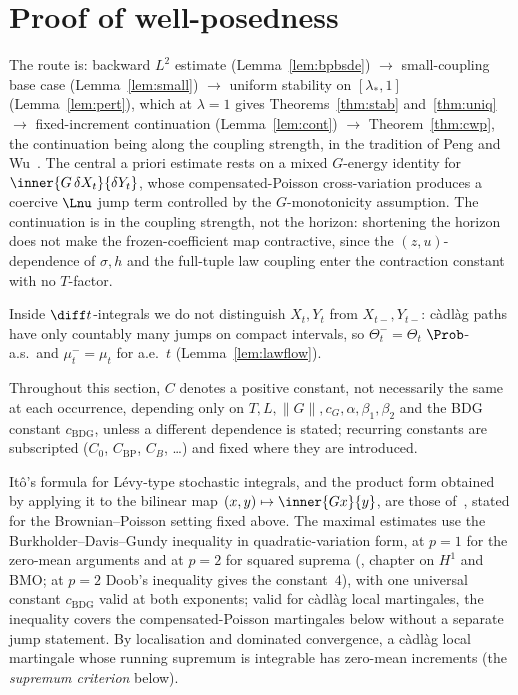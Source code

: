 \section{Proof of well-posedness}
\label{sec:wp-proof}

The route is: backward $L^2$ estimate
(Lemma~\ref{lem:bpbsde}) $\to$ small-coupling base case (Lemma~\ref{lem:small}) $\to$
uniform stability on $[\lambda_*,1]$ (Lemma~\ref{lem:pert}), which at $\lambda=1$ gives
Theorems~\ref{thm:stab} and~\ref{thm:uniq} $\to$ fixed-increment continuation
(Lemma~\ref{lem:cont}) $\to$ Theorem~\ref{thm:cwp}, the continuation being along the
coupling strength, in the tradition of Peng and Wu~\cite{PengWu}. The central a priori
estimate rests on a mixed $G$-energy identity for $\inner{G\,\delta X_t}{\delta Y_t}$,
whose compensated-Poisson cross-variation produces a coercive $\Lnu$ jump term controlled
by the $G$-monotonicity assumption. The continuation is in the coupling strength, not the
horizon: shortening the horizon does not make the frozen-coefficient map contractive,
since the $(z,u)$-dependence of $\sigma,h$ and the full-tuple law coupling enter the
contraction constant with no $T$-factor.

Inside $\diff t$-integrals we do not distinguish $X_t,Y_t$ from $X_{t-},Y_{t-}$:
c\`adl\`ag paths have only countably many jumps on compact intervals, so
$\Theta_t^-=\Theta_t$ $\Prob$-a.s.\ and $\mu_t^-=\mu_t$ for a.e.\ $t$
(Lemma~\ref{lem:lawflow}).

Throughout this section, $C$ denotes a positive constant, not necessarily the same at each
occurrence, depending only on $T,L,\|G\|,c_G,\alpha,\beta_1,\beta_2$ and the BDG constant
$c_{\mathrm{BDG}}$, unless a different dependence is stated; recurring constants are
subscripted ($C_0$, $C_{\mathrm{BP}}$, $C_B$, \dots) and fixed where they are introduced.

It\^o's formula for L\'evy-type stochastic integrals, and the product form obtained by
applying it to the bilinear map $(x,y)\mapsto\inner{Gx}{y}$, are those
of~\cite[\S4.4]{Applebaum}, stated for the Brownian--Poisson setting fixed above. The
maximal estimates use the Burkholder--Davis--Gundy inequality in quadratic-variation form,
at $p=1$ for the zero-mean arguments and at $p=2$ for squared suprema
(\cite{HeWangYan}, chapter on $H^1$ and BMO; at $p=2$ Doob's inequality gives the
constant~$4$), with one universal constant $c_{\mathrm{BDG}}$ valid at both exponents; valid
for c\`adl\`ag local martingales, the inequality covers the compensated-Poisson martingales
below without a separate jump statement. By localisation and dominated convergence, a c\`adl\`ag local
martingale whose running supremum is integrable has zero-mean increments (the
\emph{supremum criterion} below).

